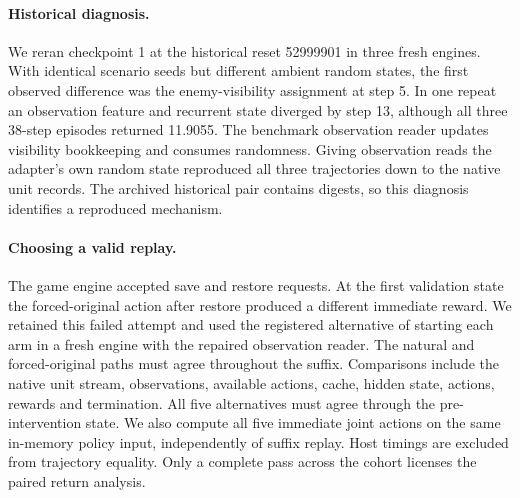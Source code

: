 \documentclass[pdflatex,sn-mathphys-num]{sn-jnl}
\begin{document}
\paragraph{Historical diagnosis.} We reran checkpoint 1 at the historical reset 52999901 in three fresh engines. With identical scenario seeds but different ambient random states, the first observed difference was the enemy-visibility assignment at step 5. In one repeat an observation feature and recurrent state diverged by step 13, although all three 38-step episodes returned 11.9055. The benchmark observation reader updates visibility bookkeeping and consumes randomness. Giving observation reads the adapter's own random state reproduced all three trajectories down to the native unit records. The archived historical pair contains digests, so this diagnosis identifies a reproduced mechanism.

\paragraph{Choosing a valid replay.} The game engine accepted save and restore requests. At the first validation state the forced-original action after restore produced a different immediate reward. We retained this failed attempt and used the registered alternative of starting each arm in a fresh engine with the repaired observation reader. The natural and forced-original paths must agree throughout the suffix. Comparisons include the native unit stream, observations, available actions, cache, hidden state, actions, rewards and termination. All five alternatives must agree through the pre-intervention state. We also compute all five immediate joint actions on the same in-memory policy input, independently of suffix replay. Host timings are excluded from trajectory equality. Only a complete pass across the cohort licenses the paired return analysis.
\end{document}
